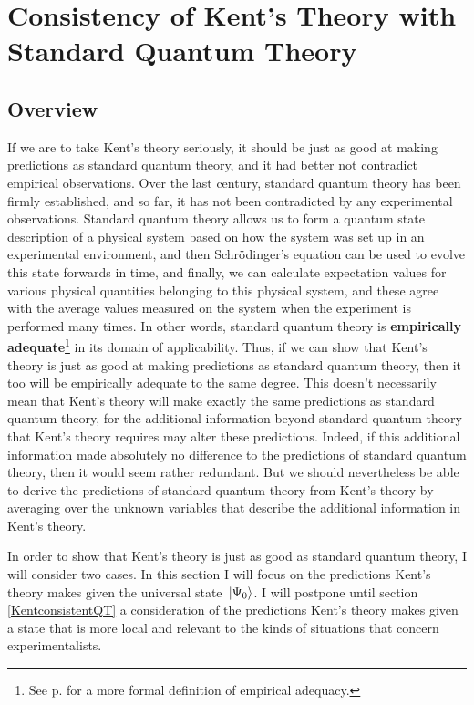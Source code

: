 \section{Consistency of Kent's Theory with Standard Quantum Theory\label{kentinterpretationconsistency}}
\subsection{Overview}
If we are to take Kent's theory seriously, it should be just as good at making predictions as standard quantum theory, and it had better not contradict empirical observations. Over the last century, standard quantum theory has been firmly established, and so far, it has not been contradicted by any experimental observations. Standard quantum theory allows us to form a quantum state description of a physical system based on how the system was set up in an experimental environment, and then Schr\"{o}dinger's equation can be used to evolve this state forwards in time, and finally, we can calculate expectation values for various physical quantities belonging to this physical system, and these agree with the average values measured on the system when the experiment is performed many times. In other words, standard quantum theory is \textbf{empirically adequate}\footnote{See p. \pageref{adeq} for a more formal definition of empirical adequacy.} in its domain of applicability. Thus, if we can show that Kent's theory is just as good at making predictions as standard quantum theory, then it too will be empirically adequate to the same degree. This doesn't necessarily mean that Kent's theory will make exactly the same predictions as standard quantum theory, for the additional information  beyond standard quantum theory that Kent's theory requires may alter these predictions. Indeed, if this additional information made absolutely no difference to the predictions of standard quantum theory, then it would seem rather redundant. But we should nevertheless be able to derive the predictions of standard quantum theory from Kent's theory by averaging over the unknown variables that describe the additional information in Kent's theory.  

In order to show that Kent's theory is just as good as standard quantum theory, I will consider two cases. In this section I will focus on the predictions Kent's theory makes given the universal state $\ket*{\Psi_0}$. I will postpone until section \ref{KentconsistentQT} a consideration of the predictions Kent's theory makes given a state that is more local and relevant to the kinds of situations that concern experimentalists. 

